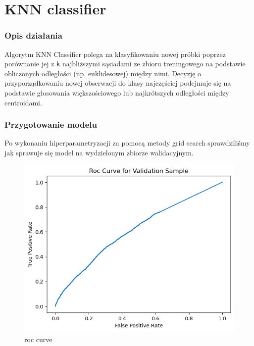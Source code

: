 \documentclass[11pt]{article}
\begin{document}
    \hypertarget{knn-classifier}{%
\section{KNN classifier}\label{knn-classifier}}

\hypertarget{opis-dziaux142ania}{%
\subsubsection{Opis działania}\label{opis-dziaux142ania}}

Algorytm KNN Classifier polega na klasyfikowaniu nowej próbki poprzez
porównanie jej z \texttt{k} najbliższymi sąsiadami ze zbioru
treningowego na podstawie obliczonych odległości (np. euklidesowej)
między nimi. Decyzję o przyporządkowaniu nowej obserwacji do klasy
najczęściej podejmuje się na podstawie głosowania większościowego lub
najkrótszych odległości między centroidami.

\hypertarget{przygotowanie-modelu}{%
\subsubsection{Przygotowanie modelu}\label{przygotowanie-modelu}}

Po wykonaniu hiperparametryzacji za pomocą metody grid search
sprawdziliśmy jak sprawuje się model na wydzielonym zbiorze
walidacyjnym.

\begin{figure}
\centering
\includegraphics{plots/KNN_roc.png}
\caption{roc curve}
\end{figure}
\end{document}
